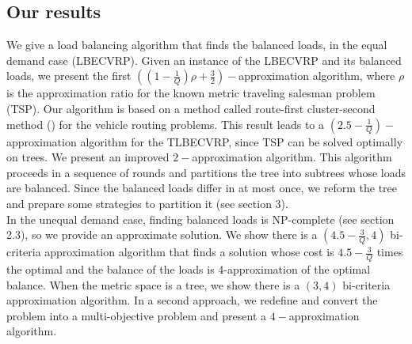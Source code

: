 \subsection{Our results}
\indent  We give a load balancing algorithm that finds the balanced loads, in the equal demand case (LBECVRP). Given an instance of the LBECVRP and its balanced loads, we present the first $((1-\frac{1}{Q})\rho +\frac{3}{2})-$approximation algorithm, where $\rho$ is the approximation ratio for the known metric traveling salesman problem (TSP). Our algorithm is based on a method called route-first cluster-second method  (\cite{Beasley}) for the vehicle routing problems. This result leads to a $(2.5-\frac{1}{Q})-$approximation algorithm for the TLBECVRP, since TSP can be solved optimally on trees. We present an improved $2-$approximation algorithm. This algorithm proceeds in a sequence of rounds and partitions the tree into subtrees whose loads are balanced. Since the balanced loads differ in at most once, we reform the tree and prepare some strategies to partition it (see section 3). \\
\indent In the unequal demand case, finding balanced loads is NP-complete (see section 2.3), so we provide an approximate solution. We show there is a $(4.5-\frac{3}{Q},4)$ bi-criteria approximation algorithm that finds a solution whose cost is $4.5-\frac{3}{Q}$ times the optimal and the balance of the loads is 4-approximation of the optimal balance. When the metric space is a tree, we show there is a $(3,4)$ bi-criteria approximation algorithm. In a second approach, we redefine and convert the problem into a multi-objective problem and present a $4-$approximation algorithm.
